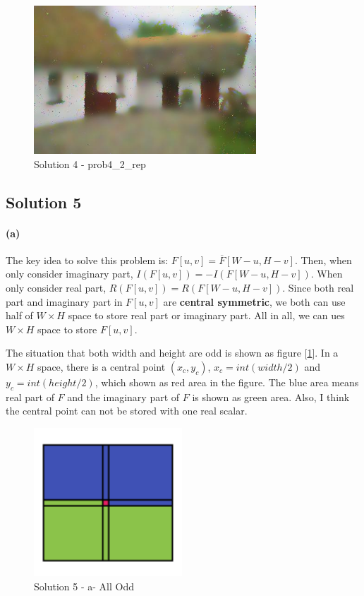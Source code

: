 \documentclass{article}
\newcommand{\solution}[1]{\clearpage \subsection*{Solution #1}}
\newcommand{\spart}[1]{\paragraph{(#1)}}
\begin{document}
\begin{figure}[!h]
  \centering
  \includegraphics[height=15em]{"code/outputs/prob4_2_rep.jpg"}
  \caption{Solution 4 - prob4\_2\_rep}
\end{figure}
\solution{5} 
\spart{a}
The key idea to solve this problem is: $F[u,v] = \overline{F}[W-u, H-v]$.
Then, when only consider imaginary part, $I(F[u,v]) = -I(F[W-u, H-v])$. When only consider real part, $R(F[u,v]) = R(F[W-u, H-v])$.
Since both real part and imaginary part in $F[u,v]$ are \textbf{central symmetric}, we both can use half of $W\times H$ space to store real part or imaginary part.
All in all, we can ues $W\times H$ space to store $F[u,v]$.

The situation that both width and height are odd is shown as figure [\ref{fig:5a-all-odd}]. 
In a $W\times H$ space, there is a central point $(x_c, y_c)$, $x_c = int(width/2)$ and $y_c = int(height/2)$, which shown as red area in the figure.
The blue area means real part of $F$ and the imaginary part of $F$ is shown as green area.
Also, I think the central point can not be stored with one real scalar.
\begin{figure}[!h]
  \centering
  \includegraphics[height=15em]{"./All-odd.png"}
  \caption{Solution 5 - a- All Odd}
  \label{fig:5a-all-odd}
\end{figure}
\end{document}
